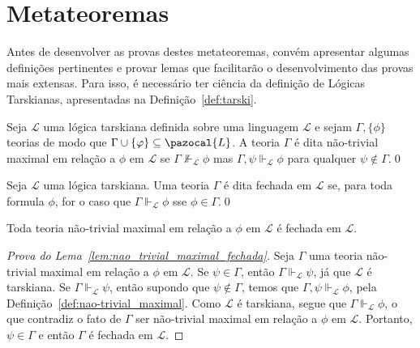                 
\section{Metateoremas}
    \label{sec:metateoremas}
    Antes de desenvolver as provas destes metateoremas, convém apresentar algumas definições pertinentes e provar lemas que facilitarão o desenvolvimento das provas mais extensas. Para isso, é necessário ter ciência da definição de Lógicas Tarskianas, apresentadas na Definição~\ref{def:tarski}.

    \begin{definicao}
        \label{def:nao-trivial_maximal}
        Seja $\mathcal{L}$ uma lógica tarskiana definida sobre uma linguagem $\mathcal{L}$ e sejam $\Gamma, \{\phi\}$ teorias de modo que $\Gamma \cup \{\phi\} \subseteq \pazocal{L}$. A teoria $\Gamma$ é dita não-trivial maximal em relação a $\phi$ em $\mathcal{L}$ se $\Gamma \nVdash_{\mathcal{L}} \phi$ mas $\Gamma, \psi \Vdash_{\mathcal{L}} \phi$ para qualquer $\psi \notin \Gamma$.\qed{}
    \end{definicao}

     

    \begin{definicao}
        \label{def:fechada}

        Seja $\mathcal{L}$ uma lógica tarskiana. Uma teoria $\Gamma$ é dita fechada em $\mathcal{L}$ se, para toda formula $\phi$, for o caso que $\Gamma \Vdash_{\mathcal{L}} \phi$ sse $\phi \in \Gamma$.\qed{}
    \end{definicao}

    \begin{lema}
        \label{lem:nao_trivial_maximal_fechada}
        Toda teoria não-trivial maximal em relação a $\phi$ em $\mathcal{L}$ é fechada em $\mathcal{L}$.
    \end{lema}

    \begin{proof}[Prova do Lema~\ref{lem:nao_trivial_maximal_fechada}]
        Seja $\Gamma$ uma teoria não-trivial maximal em relação a $\phi$ em $\mathcal{L}$. Se $\psi \in \Gamma$, então $\Gamma \Vdash_{\mathcal{L}} \psi$, já que $\mathcal{L}$ é tarskiana. Se $\Gamma \Vdash_{\mathcal{L}} \psi$, então supondo que $\psi \notin \Gamma$, temos que $\Gamma, \psi \Vdash_{\mathcal{L}} \phi$, pela Definição~\ref{def:nao-trivial_maximal}. Como $\mathcal{L}$ é tarskiana, segue que $\Gamma \Vdash_{\mathcal{L}} \phi$, o que contradiz o fato de $\Gamma$ ser não-trivial maximal em relação a $\phi$ em $\mathcal{L}$. Portanto, $\psi \in \Gamma$ e então $\Gamma$ é fechada em $\mathcal{L}$.
    \end{proof}

